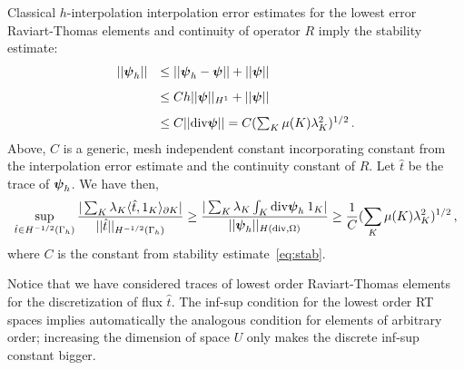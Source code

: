 \documentclass[Proposal.tex]{subfiles}
\begin{document}
Classical $h$-interpolation interpolation error estimates for the lowest error
Raviart-Thomas elements and continuity of operator $R$ imply the stability estimate:
\begin{equation}
\begin{array}{lll}
|| \boldsymbol\psi_h || & \leq || \boldsymbol\psi_h - \boldsymbol\psi || + || \boldsymbol\psi ||\\[8pt]
&\leq C h || \boldsymbol\psi ||_{H^1} +  || \boldsymbol\psi || \\[8pt]
& \leq C || \text{div} \boldsymbol\psi || = C (\sum_K \mu(K) \lambda_K^2)^{1/2}\,.
\end{array}
\label{eq:stab}
\end{equation}
Above, $C$ is a generic, mesh independent constant incorporating constant from
the interpolation error estimate and the continuity constant of $R$.
Let $\hat{t}$ be the trace of $\boldsymbol\psi_h$. We have then,
\begin{equation}
\sup_{\hat{t} \in H^{-1/2}(\Gamma_h)} \frac{|  \sum_K \lambda_K \langle
\hat{t},1_K \rangle_{\partial K} |}{|| \hat{t} ||_{H^{-1/2}(\Gamma_h)}}
\geq \frac{| \sum_K \lambda_K \int_K \text{div} \boldsymbol\psi_h \: 1_K  |}
{|| \boldsymbol\psi_h ||_{H(\text{div},\Omega)}}
\geq \frac{1}{C} (\sum_K \mu(K) \lambda_K^2)^{1/2}\,,
\end{equation}
where $C$ is the constant from stability estimate~\eqref{eq:stab}.

Notice that we have considered traces of lowest order Raviart-Thomas elements
for the discretization of flux $\hat{t}$. The inf-sup condition for the lowest
order RT spaces implies automatically the analogous condition for elements of
arbitrary order; increasing the dimension of space $U$ only makes the discrete
inf-sup constant bigger.
\end{document}
